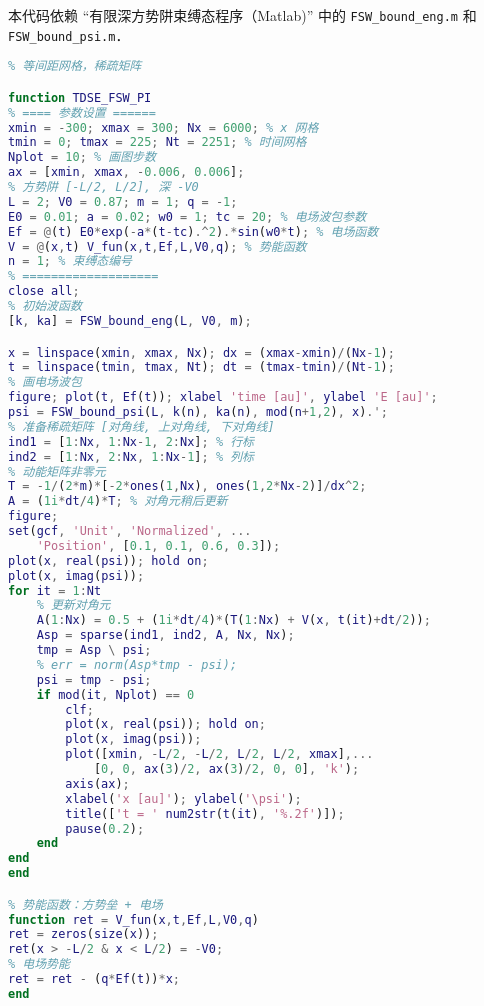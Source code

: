 本代码依赖 “有限深方势阱束缚态程序（Matlab)” 中的 \verb|FSW_bound_eng.m| 和 \verb|FSW_bound_psi.m|．
\begin{lstlisting}[language=matlab]
% 一维有限深方势阱中的光电离模拟
% 等间距网格，稀疏矩阵

function TDSE_FSW_PI
% ==== 参数设置 ======
xmin = -300; xmax = 300; Nx = 6000; % x 网格
tmin = 0; tmax = 225; Nt = 2251; % 时间网格
Nplot = 10; % 画图步数
ax = [xmin, xmax, -0.006, 0.006];
% 方势阱 [-L/2, L/2], 深 -V0
L = 2; V0 = 0.87; m = 1; q = -1;
E0 = 0.01; a = 0.02; w0 = 1; tc = 20; % 电场波包参数
Ef = @(t) E0*exp(-a*(t-tc).^2).*sin(w0*t); % 电场函数
V = @(x,t) V_fun(x,t,Ef,L,V0,q); % 势能函数
n = 1; % 束缚态编号
% ===================
close all;
% 初始波函数
[k, ka] = FSW_bound_eng(L, V0, m);

x = linspace(xmin, xmax, Nx); dx = (xmax-xmin)/(Nx-1);
t = linspace(tmin, tmax, Nt); dt = (tmax-tmin)/(Nt-1);
% 画电场波包
figure; plot(t, Ef(t)); xlabel 'time [au]', ylabel 'E [au]';
psi = FSW_bound_psi(L, k(n), ka(n), mod(n+1,2), x).';
% 准备稀疏矩阵 [对角线, 上对角线, 下对角线]
ind1 = [1:Nx, 1:Nx-1, 2:Nx]; % 行标
ind2 = [1:Nx, 2:Nx, 1:Nx-1]; % 列标
% 动能矩阵非零元
T = -1/(2*m)*[-2*ones(1,Nx), ones(1,2*Nx-2)]/dx^2;
A = (1i*dt/4)*T; % 对角元稍后更新
figure;
set(gcf, 'Unit', 'Normalized', ...
    'Position', [0.1, 0.1, 0.6, 0.3]);
plot(x, real(psi)); hold on;
plot(x, imag(psi));
for it = 1:Nt
    % 更新对角元
    A(1:Nx) = 0.5 + (1i*dt/4)*(T(1:Nx) + V(x, t(it)+dt/2));
    Asp = sparse(ind1, ind2, A, Nx, Nx);
    tmp = Asp \ psi;
    % err = norm(Asp*tmp - psi);
    psi = tmp - psi;
    if mod(it, Nplot) == 0
        clf;
        plot(x, real(psi)); hold on;
        plot(x, imag(psi));
        plot([xmin, -L/2, -L/2, L/2, L/2, xmax],...
            [0, 0, ax(3)/2, ax(3)/2, 0, 0], 'k');
        axis(ax);
        xlabel('x [au]'); ylabel('\psi');
        title(['t = ' num2str(t(it), '%.2f')]);
        pause(0.2);
    end
end
end

% 势能函数：方势垒 + 电场
function ret = V_fun(x,t,Ef,L,V0,q)
ret = zeros(size(x));
ret(x > -L/2 & x < L/2) = -V0;
% 电场势能
ret = ret - (q*Ef(t))*x;
end
\end{lstlisting}
